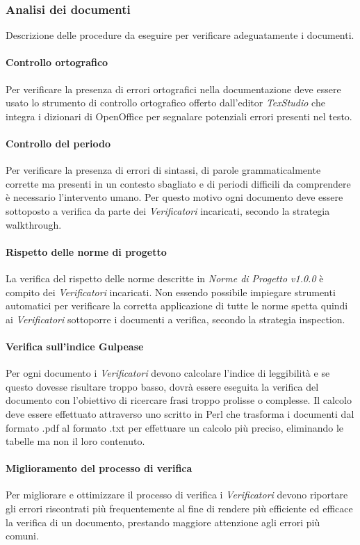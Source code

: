 \subsubsection{Analisi dei documenti}
 Descrizione delle procedure da eseguire per verificare adeguatamente i documenti.

\paragraph{Controllo ortografico} \Spazio
Per verificare la presenza di errori ortografici nella documentazione deve essere usato lo strumento di controllo ortografico offerto dall'editor \emph{TexStudio} che integra i dizionari di OpenOffice per segnalare potenziali errori presenti nel testo.

\paragraph{Controllo del periodo} \Spazio
Per verificare la presenza di errori di sintassi, di parole grammaticalmente corrette ma presenti in un contesto sbagliato e di periodi difficili da comprendere è necessario l'intervento umano. Per questo motivo ogni documento deve essere sottoposto a verifica da parte dei \emph{Verificatori} incaricati, secondo la strategia walkthrough.

\paragraph{Rispetto delle norme di progetto} \Spazio
La verifica del rispetto delle norme descritte in \emph{Norme di Progetto v1.0.0} è compito dei \emph{Verificatori} incaricati. Non essendo possibile impiegare strumenti automatici per verificare la corretta applicazione di tutte le norme spetta quindi ai \emph{Verificatori} sottoporre i documenti a verifica, secondo la strategia inspection.

\paragraph{Verifica sull'indice Gulpease} \Spazio
Per ogni documento i \emph{Verificatori} devono calcolare l'indice di leggibilità e se questo dovesse risultare troppo basso, dovrà essere eseguita la verifica del documento con l'obiettivo di ricercare frasi troppo prolisse o complesse. Il calcolo deve essere effettuato attraverso uno  scritto in Perl che trasforma i documenti dal formato .pdf al formato .txt per effettuare un calcolo più preciso, eliminando le tabelle ma non il loro contenuto.

\paragraph{Miglioramento del processo di verifica} \Spazio
Per migliorare e ottimizzare il processo di verifica i \emph{Verificatori} devono riportare gli errori riscontrati più frequentemente al fine di rendere più efficiente ed efficace la verifica di un documento, prestando maggiore attenzione agli errori più comuni.



\pagebreak
